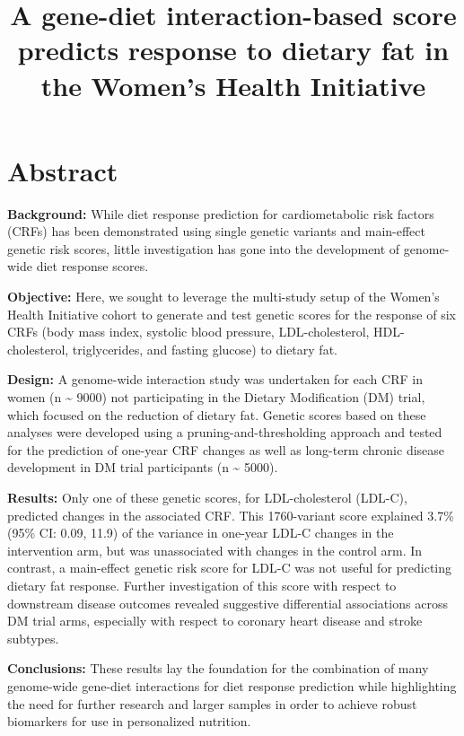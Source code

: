\documentclass[]{article}
\title{A gene-diet interaction-based score predicts response to dietary fat in
the Women's Health Initiative}
\author{}
\date{}
\begin{document}
\maketitle

\hypertarget{abstract}{%
\section{Abstract}\label{abstract}}

\textbf{Background:} While diet response prediction for cardiometabolic
risk factors (CRFs) has been demonstrated using single genetic variants
and main-effect genetic risk scores, little investigation has gone into
the development of genome-wide diet response scores.

\textbf{Objective:} Here, we sought to leverage the multi-study setup of
the Women's Health Initiative cohort to generate and test genetic scores
for the response of six CRFs (body mass index, systolic blood pressure,
LDL-cholesterol, HDL-cholesterol, triglycerides, and fasting glucose) to
dietary fat.

\textbf{Design:} A genome-wide interaction study was undertaken for each
CRF in women (n \textasciitilde{} 9000) not participating in the Dietary
Modification (DM) trial, which focused on the reduction of dietary fat.
Genetic scores based on these analyses were developed using a
pruning-and-thresholding approach and tested for the prediction of
one-year CRF changes as well as long-term chronic disease development in
DM trial participants (n \textasciitilde{} 5000).

\textbf{Results:} Only one of these genetic scores, for LDL-cholesterol
(LDL-C), predicted changes in the associated CRF. This 1760-variant
score explained 3.7\% (95\% CI: 0.09, 11.9) of the variance in one-year
LDL-C changes in the intervention arm, but was unassociated with changes
in the control arm. In contrast, a main-effect genetic risk score for
LDL-C was not useful for predicting dietary fat response. Further
investigation of this score with respect to downstream disease outcomes
revealed suggestive differential associations across DM trial arms,
especially with respect to coronary heart disease and stroke subtypes.

\textbf{Conclusions:} These results lay the foundation for the
combination of many genome-wide gene-diet interactions for diet response
prediction while highlighting the need for further research and larger
samples in order to achieve robust biomarkers for use in personalized
nutrition.
\end{document}
